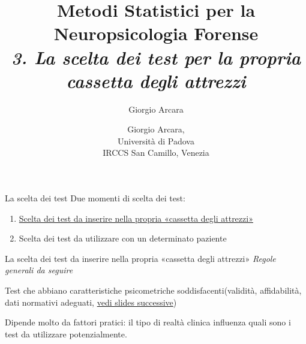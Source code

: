 \documentclass[
  ignorenonframetext,
]{beamer}
\author{Giorgio Arcara}
\date{}
\begin{document}
\begin{frame}
\title{Metodi Statistici per la Neuropsicologia Forense\\ \vspace{1em} \emph{3. La scelta dei test per la propria cassetta degli attrezzi}}
\author{Giorgio Arcara,\\ Università di Padova \\ IRCCS San Camillo, Venezia}

\maketitle
\end{frame}

\begin{frame}{La scelta dei test}
\label{la-scelta-dei-test}
Due momenti di scelta dei test:

\begin{enumerate}[<+->]
[1)]
\item
  \underline{Scelta dei test da inserire nella propria «cassetta degli attrezzi»}
\item
  Scelta dei test da utilizzare con un determinato paziente
\end{enumerate}
\end{frame}

\begin{frame}{La scelta dei test da inserire nella propria «cassetta
degli attrezzi»}
\label{la-scelta-dei-test-da-inserire-nella-propria-cassetta-degli-attrezzi}
\emph{Regole generali da seguire}

Test che abbiano caratteristiche psicometriche soddisfacenti(validità,
affidabilità, dati normativi adeguati,
\underline{vedi slides successive})

Dipende molto da fattori pratici: il tipo di realtà clinica influenza
quali sono i test da utilizzare potenzialmente.
\end{frame}
\end{document}
